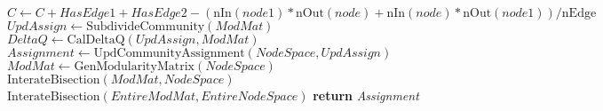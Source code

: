 \begin{algorithm}[H]
\begin{algorithmic}[1]
		 {$C \gets C+\textit{HasEdge1}+\textit{HasEdge2}-(\text{nIn} (\textit{node1})*\text{nOut}(\textit{node})+\text{nIn}( \textit{node})*\text{nOut}(\textit{node1}))/\text{nEdge}$}
		\EndFor
		\EndIf
		\EndFor
		\EndFor
		\EndProcedure
		\State $\textit{UpdAssign} \gets \text{SubdivideCommunity}(ModMat)$
		\State $\textit{DeltaQ} \gets \text{CalDeltaQ}(\textit{UpdAssign}, \textit{ModMat})$
		\State $\textit{Assignment} \gets \text{UpdCommunityAssignment}(\textit{NodeSpace}, \textit{UpdAssign})$
		\State $\textit{ModMat} \gets \text{GenModularityMatrix}(\textit{NodeSpace})$
		\State $\text{InterateBisection}(ModMat, NodeSpace)$
		\EndFor
		\EndIf 
		\EndProcedure
		\State $\text{InterateBisection}(EntireModMat, EntireNodeSpace)$
		\State \textbf{return} \emph{Assignment}
		\EndProcedure
	\end{algorithmic}
\end{algorithm}
